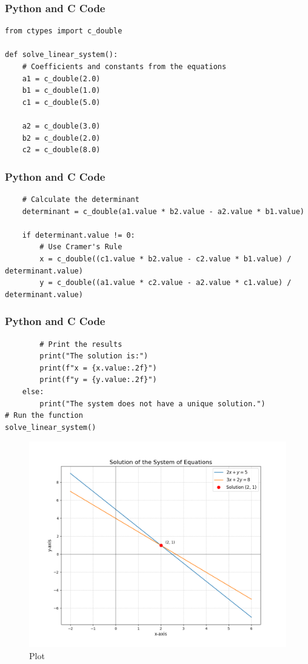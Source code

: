\documentclass{beamer}
\begin{document}
\begin{frame}[fragile]
\frametitle{Python and C Code}
\begin{lstlisting}
from ctypes import c_double

def solve_linear_system():
    # Coefficients and constants from the equations
    a1 = c_double(2.0)
    b1 = c_double(1.0)
    c1 = c_double(5.0)

    a2 = c_double(3.0)
    b2 = c_double(2.0)
    c2 = c_double(8.0)
\end{lstlisting}
\end{frame}

\begin{frame}[fragile]
\frametitle{Python and C Code}
\begin{lstlisting}
    # Calculate the determinant
    determinant = c_double(a1.value * b2.value - a2.value * b1.value)

    if determinant.value != 0:
        # Use Cramer's Rule
        x = c_double((c1.value * b2.value - c2.value * b1.value) / determinant.value)
        y = c_double((a1.value * c2.value - a2.value * c1.value) / determinant.value)
\end{lstlisting}
\end{frame}

\begin{frame}[fragile]
\frametitle{Python and C Code}
\begin{lstlisting}
        # Print the results
        print("The solution is:")
        print(f"x = {x.value:.2f}")
        print(f"y = {y.value:.2f}")
    else:
        print("The system does not have a unique solution.")
# Run the function
solve_linear_system()

\end{lstlisting}
\end{frame}
\begin{frame}
\begin{figure}
    \centering
    \includegraphics[width=0.75\columnwidth]{graph10.png}
    \caption{Plot}
    \label{fig:Line}
\end{figure}
\end{frame}
\end{document}
